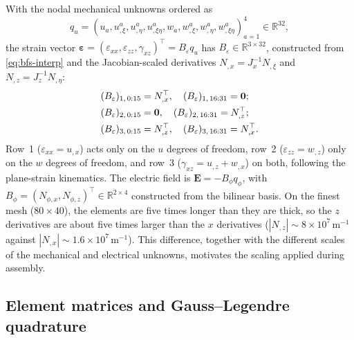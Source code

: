 \documentclass[a4paper,12pt]{elsarticle}
\begin{document}
With the nodal mechanical unknowns ordered as
\[
q_u=(u_a,u_{,\xi}^a,u_{,\eta}^a,u_{,\xi\eta}^a,
w_a,w_{,\xi}^a,w_{,\eta}^a,w_{,\xi\eta}^a)_{a=1}^{4}\in\mathbb{R}^{32},
\]
the strain vector
$\bm\varepsilon=(\varepsilon_{xx},\varepsilon_{zz},\gamma_{xz})^\top
=B_\varepsilon q_u$ has $B_\varepsilon\in\mathbb{R}^{3\times32}$, constructed from
\eqref{eq:bfs-interp} and the Jacobian-scaled derivatives
$N_{,x}=J_x^{-1}N_{,\xi}$ and $N_{,z}=J_z^{-1}N_{,\eta}$:
\begin{align}
(B_\varepsilon)_{1,\,0:15}&=N_{,x}^\top,\quad
(B_\varepsilon)_{1,\,16:31}=\bm0;\notag\\
(B_\varepsilon)_{2,\,0:15}&=\bm0,\quad
(B_\varepsilon)_{2,\,16:31}=N_{,z}^\top;\notag\\
(B_\varepsilon)_{3,\,0:15}&=N_{,z}^\top,\quad
(B_\varepsilon)_{3,\,16:31}=N_{,x}^\top.
\label{eq:Beps}
\end{align}
Row~1 ($\varepsilon_{xx}=u_{,x}$) acts only on the $u$ degrees of freedom,
row~2 ($\varepsilon_{zz}=w_{,z}$) only on the $w$ degrees of freedom, and row~3
($\gamma_{xz}=u_{,z}+w_{,x}$) on both, following the plane-strain kinematics. The electric field is
$\bm E=-B_\phi q_\phi$, with
$B_\phi=(N_{\phi,x},N_{\phi,z})^\top\in\mathbb{R}^{2\times4}$ constructed from the
bilinear basis. On the finest mesh ($80\times40$), the elements are five times longer
than they are thick, so the $z$ derivatives are about five times larger than the
$x$ derivatives ($|N_{,z}|\sim8\times10^{7}\,\text{m}^{-1}$ against
$|N_{,x}|\sim1.6\times10^{7}\,\text{m}^{-1}$). This difference, together with the
different scales of the mechanical and electrical unknowns, motivates the scaling
applied during assembly.

\subsection{Element matrices and Gauss--Legendre quadrature}
\end{document}

